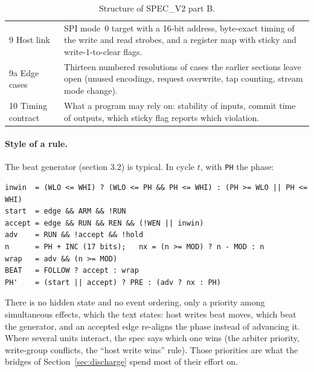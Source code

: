 \documentclass[11pt,a4paper]{article}
\newcommand{\brkus}{\textunderscore\allowbreak}
\newcommand{\code}[1]{{\let\_\brkus\texttt{#1}}}
\begin{document}
\begin{table}[!ht]
\begin{tabularx}{\linewidth}{@{}l>{\raggedright\arraybackslash}X@{}}
9 Host link & SPI mode~0 target with a 16-bit address, byte-exact timing of the
  write and read strobes, and a register map with sticky and
  write-1-to-clear flags. \\
9a Edge cases & Thirteen numbered resolutions of cases the earlier sections
  leave open (unused encodings, request overwrite, tap counting, stream mode
  change). \\
10 Timing contract & What a program may rely on: stability of inputs, commit
  time of outputs, which sticky flag reports which violation. \\
\bottomrule
\end{tabularx}
\caption{Structure of SPEC\_V2 part B.}
\end{table}

\paragraph{Style of a rule.} The beat generator (section 3.2) is typical. In
cycle $t$, with \code{PH} the phase:
\begin{lstlisting}[language={}]
inwin  = (WLO <= WHI) ? (WLO <= PH && PH <= WHI) : (PH >= WLO || PH <= WHI)
start  = edge && ARM && !RUN
accept = edge && RUN && REN && (!WEN || inwin)
adv    = RUN && !accept && !hold
n      = PH + INC (17 bits);   nx = (n >= MOD) ? n - MOD : n
wrap   = adv && (n >= MOD)
BEAT   = FOLLOW ? accept : wrap
PH'    = (start || accept) ? PRE : (adv ? nx : PH)
\end{lstlisting}
There is no hidden state and no event ordering, only a priority among
simultaneous effects, which the text states: host writes beat moves, which beat
the generator, and an accepted edge re-aligns the phase instead of advancing it.
Where several units interact, the spec says which one wins (the arbiter priority,
write-group conflicts, the ``host write wins'' rule). Those priorities are what
the bridges of Section~\ref{sec:discharge} spend most of their effort on.
\end{document}
